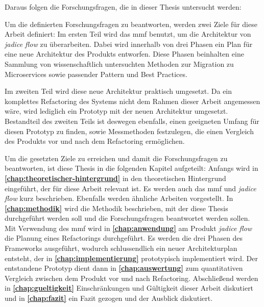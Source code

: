 Daraus folgen die Forschungsfragen, die in dieser Thesis untersucht werden:


Um die definierten Forschungsfragen zu beantworten, werden zwei Ziele für diese Arbeit definiert:
Im ersten Teil wird das \gls{mmf} benutzt, um die Architektur von \emph{jadice flow} zu überarbeiten.
Dabei wird innerhalb von drei Phasen ein Plan für eine neue Architektur des Produkts entworfen.
Diese Phasen beinhalten eine Sammlung von wissenschaftlich untersuchten Methoden zur Migration zu Microservices sowie passender Pattern und Best Practices.

Im zweiten Teil wird diese neue Architektur praktisch umgesetzt.
Da ein komplettes Refactoring des Systems nicht dem Rahmen dieser Arbeit angemessen wäre, wird lediglich ein Prototyp mit der neuen Architektur umgesetzt.
Bestandteil des zweiten Teils ist deswegen ebenfalls, einen geeigneten Umfang für diesen Prototyp zu finden, sowie Messmethoden festzulegen, die einen Vergleich des Produkts vor und nach dem Refactoring ermöglichen.

Um die gesetzten Ziele zu erreichen und damit die Forschungsfragen zu beantworten, ist diese Thesis in die folgenden Kapitel aufgeteilt:
Anfangs wird in \textbf{\cref{chap:theoretischer-hintergrund}} in den theoretischen Hintergrund eingeführt, der für diese Arbeit relevant ist. 
Es werden auch das \gls{mmf} und \emph{jadice flow} kurz beschrieben. 
Ebenfalls werden ähnliche Arbeiten vorgestellt.
In \textbf{\cref{chap:methodik}} wird die Methodik beschrieben, mit der diese Thesis durchgeführt werden soll und die Forschungsfragen beantwortet werden sollen.
Mit Verwendung des \gls{mmf} wird in \textbf{\cref{chap:anwendung}} am Produkt \emph{jadice flow} die Planung eines Refactorings durchgeführt. 
Es werden die drei Phasen des Frameworks ausgeführt, wodurch schlussendlich ein neuer Architekturplan entsteht, der in \textbf{\cref{chap:implementierung}} prototypisch implementiert wird.
Der entstandene Prototyp dient dann in \textbf{\cref{chap:auswertung}} zum quantitativen Vergleich zwischen dem Produkt vor und nach Refactoring.
Abschließend werden in \textbf{\cref{chap:gueltigkeit}} Einschränkungen und Gültigkeit dieser Arbeit diskutiert und in \textbf{\cref{chap:fazit}} ein Fazit gezogen und der Ausblick diskutiert.  